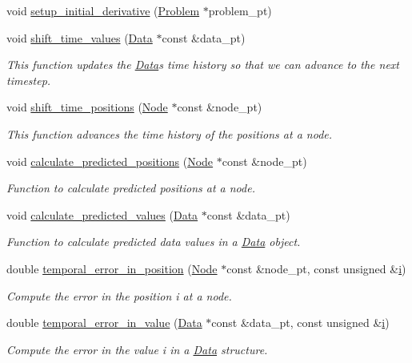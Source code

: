 \begin{DoxyCompactItemize}
\item 
void \hyperlink{classoomph_1_1TR_abde5c3804dd51162f11c50dacb65b315}{setup\+\_\+initial\+\_\+derivative} (\hyperlink{classoomph_1_1Problem}{Problem} $\ast$problem\+\_\+pt)
\item 
void \hyperlink{classoomph_1_1TR_a4f8cc75e39263619c073076ae5bbab36}{shift\+\_\+time\+\_\+values} (\hyperlink{classoomph_1_1Data}{Data} $\ast$const \&data\+\_\+pt)
\begin{DoxyCompactList}\small\item\em This function updates the \hyperlink{classoomph_1_1Data}{Data}\textquotesingle{}s time history so that we can advance to the next timestep. \end{DoxyCompactList}\item 
void \hyperlink{classoomph_1_1TR_a15ab8859ae1a87f14687dcec94f68e03}{shift\+\_\+time\+\_\+positions} (\hyperlink{classoomph_1_1Node}{Node} $\ast$const \&node\+\_\+pt)
\begin{DoxyCompactList}\small\item\em This function advances the time history of the positions at a node. \end{DoxyCompactList}\item 
void \hyperlink{classoomph_1_1TR_a5ef44b410f646c0f94eb2f5a2d80bb03}{calculate\+\_\+predicted\+\_\+positions} (\hyperlink{classoomph_1_1Node}{Node} $\ast$const \&node\+\_\+pt)
\begin{DoxyCompactList}\small\item\em Function to calculate predicted positions at a node. \end{DoxyCompactList}\item 
void \hyperlink{classoomph_1_1TR_a345daded718d96bb4b7d4cd2996892c8}{calculate\+\_\+predicted\+\_\+values} (\hyperlink{classoomph_1_1Data}{Data} $\ast$const \&data\+\_\+pt)
\begin{DoxyCompactList}\small\item\em Function to calculate predicted data values in a \hyperlink{classoomph_1_1Data}{Data} object. \end{DoxyCompactList}\item 
double \hyperlink{classoomph_1_1TR_ae77caf45f731bfc2cd5212f5934918d7}{temporal\+\_\+error\+\_\+in\+\_\+position} (\hyperlink{classoomph_1_1Node}{Node} $\ast$const \&node\+\_\+pt, const unsigned \&\hyperlink{cfortran_8h_adb50e893b86b3e55e751a42eab3cba82}{i})
\begin{DoxyCompactList}\small\item\em Compute the error in the position i at a node. \end{DoxyCompactList}\item 
double \hyperlink{classoomph_1_1TR_afbaa1753914d49942f07b601563c2cec}{temporal\+\_\+error\+\_\+in\+\_\+value} (\hyperlink{classoomph_1_1Data}{Data} $\ast$const \&data\+\_\+pt, const unsigned \&\hyperlink{cfortran_8h_adb50e893b86b3e55e751a42eab3cba82}{i})
\begin{DoxyCompactList}\small\item\em Compute the error in the value i in a \hyperlink{classoomph_1_1Data}{Data} structure. \end{DoxyCompactList}\end{DoxyCompactItemize}
